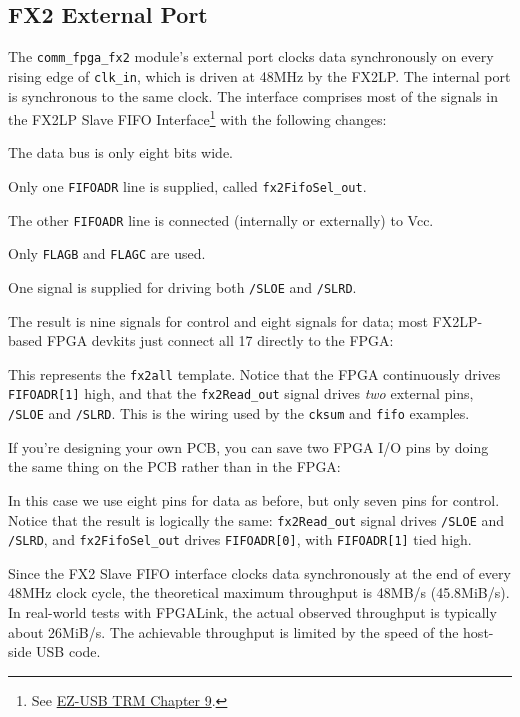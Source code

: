\subsection{FX2 External Port}
The \texttt{comm\_fpga\_fx2} module's external port clocks data synchronously on every rising edge of \texttt{clk\_in}, which is driven at 48MHz by the FX2LP. The internal port is synchronous to the same clock. The interface comprises most of the signals in the FX2LP Slave FIFO Interface\footnote{See \href{http://www.cypress.com/?docID=27095}{EZ-USB TRM Chapter 9}.} with the following changes:

\begin{blobs}
  \item The data bus is only eight bits wide.
  \item Only one \texttt{FIFOADR} line is supplied, called \texttt{fx2FifoSel\_out}.
  \item The other \texttt{FIFOADR} line is connected (internally or externally) to Vcc.
  \item Only \texttt{FLAGB} and \texttt{FLAGC} are used.
  \item One signal is supplied for driving both \texttt{/SLOE} and \texttt{/SLRD}.
\end{blobs}

The result is nine signals for control and eight signals for data; most FX2LP-based FPGA devkits just connect all 17 directly to the FPGA:


This represents the \texttt{fx2all} template. Notice that the FPGA continuously drives \texttt{FIFOADR[1]} high, and that the \texttt{fx2Read\_out} signal drives \textit{two} external pins, \texttt{/SLOE} and \texttt{/SLRD}. This is the wiring used by the \texttt{cksum} and \texttt{fifo} examples.

\newpage
If you're designing your own PCB, you can save two FPGA I/O pins by doing the same thing on the PCB rather than in the FPGA:


In this case we use eight pins for data as before, but only seven pins for control. Notice that the result is logically the same: \texttt{fx2Read\_out} signal drives \texttt{/SLOE} and \texttt{/SLRD}, and \texttt{fx2FifoSel\_out} drives \texttt{FIFOADR[0]}, with \texttt{FIFOADR[1]} tied high.

Since the FX2 Slave FIFO interface clocks data synchronously at the end of every 48MHz clock cycle, the theoretical maximum throughput is 48MB/s (45.8MiB/s). In real-world tests with FPGALink, the actual observed throughput is typically about 26MiB/s. The achievable throughput is limited by the speed of the host-side USB code.

